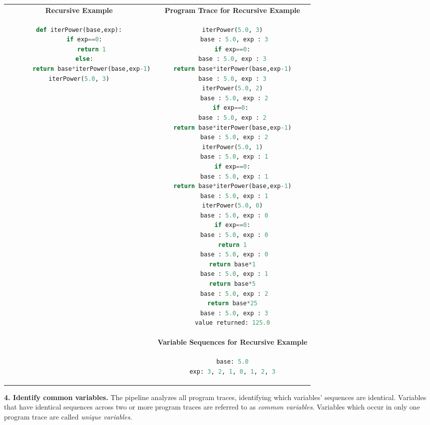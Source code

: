 \begin{tabular}{cc}
{\bf Recursive Example} & {\bf Program Trace for Recursive Example} \\
\begin{minipage}{0.5\linewidth}
\begin{lstlisting}[language=python]
def iterPower(base,exp):
   if exp==0:
       return 1
   else:
       return base*iterPower(base,exp-1)
iterPower(5.0, 3)
\end{lstlisting}
\end{minipage} &
\begin{minipage}{0.5\linewidth}
\begin{lstlisting}[language=python]
iterPower(5.0, 3)
 base : 5.0, exp : 3
if exp==0:
 base : 5.0, exp : 3 
return base*iterPower(base,exp-1)
 base : 5.0, exp : 3 
iterPower(5.0, 2)
 base : 5.0, exp : 2
if exp==0: 
 base : 5.0, exp : 2 
return base*iterPower(base,exp-1)
 base : 5.0, exp : 2
iterPower(5.0, 1)
 base : 5.0, exp : 1
if exp==0:
 base : 5.0, exp : 1
return base*iterPower(base,exp-1)
 base : 5.0, exp : 1
iterPower(5.0, 0)
 base : 5.0, exp : 0
if exp==0:
 base : 5.0, exp : 0
return 1
 base : 5.0, exp : 0
return base*1
 base : 5.0, exp : 1
return base*5
 base : 5.0, exp : 2
return base*25
 base : 5.0, exp : 3
value returned: 125.0
\end{lstlisting}
\end{minipage} 
\\
& {\bf Variable Sequences for Recursive Example} \\
&
\begin{minipage}{0.5\linewidth}
\begin{lstlisting}[language=python]
base: 5.0
exp: 3, 2, 1, 0, 1, 2, 3
\end{lstlisting}
\end{minipage} \\
\end{tabular}


{\bf 4. Identify common variables.} The pipeline analyzes all program traces, identifying which variables' sequences are identical. Variables that have identical sequences across two or more program traces are referred to as {\it common variables}. Variables which occur in only one program trace are called {\it unique variables}. 


